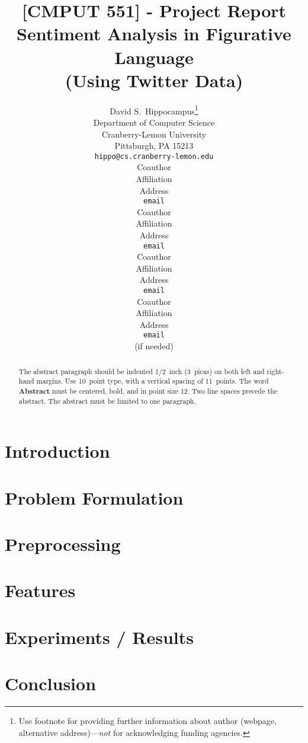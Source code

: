 \documentclass{article} %
\title{[CMPUT 551] - Project Report\\Sentiment Analysis in Figurative Language\\ \footnotesize (Using Twitter Data)\\}
\author{
David S.~Hippocampus\thanks{ Use footnote for providing further information
about author (webpage, alternative address)---\emph{not} for acknowledging
funding agencies.} \\
Department of Computer Science\\
Cranberry-Lemon University\\
Pittsburgh, PA 15213 \\
\texttt{hippo@cs.cranberry-lemon.edu} \\
\And
Coauthor \\
Affiliation \\
Address \\
\texttt{email} \\
\AND
Coauthor \\
Affiliation \\
Address \\
\texttt{email} \\
\And
Coauthor \\
Affiliation \\
Address \\
\texttt{email} \\
\And
Coauthor \\
Affiliation \\
Address \\
\texttt{email} \\
(if needed)\\
}
\begin{document}
\maketitle

\begin{abstract}
The abstract paragraph should be indented 1/2~inch (3~picas) on both left and
right-hand margins. Use 10~point type, with a vertical spacing of 11~points.
The word \textbf{Abstract} must be centered, bold, and in point size 12. Two
line spaces precede the abstract. The abstract must be limited to one
paragraph.
\end{abstract}


\section{Introduction} %
\label{sec:introduction}


\section{Problem Formulation} %
\label{sec:problem_formulation}


\section{Preprocessing} %
\label{sec:preprocessing}


\section{Features} %
\label{sec:features}


\newpage
\section{Experiments / Results} %
\label{sec:experiments_results}


\section{Conclusion} %
\label{sec:conclusion}

\end{document}
